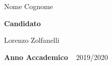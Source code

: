 \begin{titlepage}
\begin{helv}
\begin{minipage}{0.8\textwidth}
\begin{flushleft}
{            \vspace{5pt}
            \fontsize{16}{0}\selectfont
            Nome Cognome
            
            \vspace{15pt}
            \fontsize{14}{0}\selectfont
            \textbf{Candidato}
            
            \vspace{5pt}
            \fontsize{16}{0}\selectfont
            Lorenzo Zolfanelli
            
            \vspace{3cm}
            \fontsize{14}{0}\selectfont
            \textbf{Anno Accademico} ~ 2019/2020
        }
        \end{flushleft}
        \end{minipage}
\end{helv}
\end{titlepage}